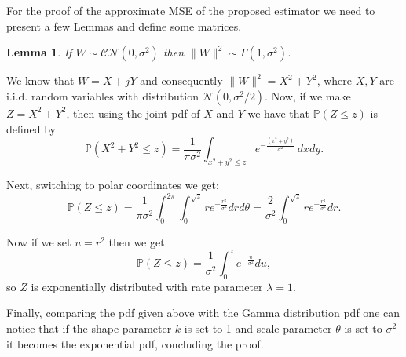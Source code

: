 \documentclass[10pt,journal,comsoc,final]{IEEEtran}
\newtheorem{lemma}{Lemma}
\begin{document}
\appendices
\section{}

For the proof of the approximate MSE of the proposed estimator we need to present a few Lemmas and define some matrices.

\begin{lemma} If $W \sim \mathcal{CN}(0,\sigma^2)$ then $\lVert W \rVert^{2} \sim \Gamma(1,\sigma^2)$.
\end{lemma}

\begin{IEEEproof} We know that $W = X + jY$ and consequently $\lVert W \rVert^{2} = X^2 + Y^2$, where $X, Y$ are i.i.d. random variables with distribution $\mathcal{N}(0,\sigma^{2}/2)$. Now, if we make $Z = X^2 + Y^2$, then using the joint pdf of $X$ and $Y$ we have that $\mathbb{P}(Z\leq z)$ is defined by
\begin{equation}\label{eq:exponential_into_gamma1}
\mathbb{P}(X^2+Y^2\leq z)= \frac{1}{\pi \sigma^2}\int_{x^2+y^2\leq z}e^{-\frac{(x^2+y^2)}{\sigma^2}} \ dxdy.
\end{equation}

Next, switching to polar coordinates we get:
\begin{equation}\label{eq:exponential_into_gamma2}
\mathbb{P}(Z\leq z) = \frac{1}{\pi \sigma^2}\int_{0}^{2\pi}\int_0^{\sqrt{z}}re^{-\frac{r^2}{\sigma^2}}drd\theta =\frac{2}{\sigma^2}\int_0^{\sqrt{z}}re^{-\frac{r^2}{\sigma^2}}dr.
\end{equation}

Now if we set $u=r^2$ then we get
\begin{equation}\label{eq:exponential_into_gamma3}
\mathbb{P}(Z\leq z)=\frac{1}{\sigma^2}\int_0^ze^{-\frac{u}{\sigma^2}}du,
\end{equation}
so $Z$ is exponentially distributed with rate parameter $\lambda = 1$.

Finally, comparing the pdf given above with the Gamma distribution pdf one can notice that  if the shape parameter $k$ is set to 1 and scale parameter $\theta$ is set to $\sigma^2$ it becomes the exponential pdf, concluding the proof.
\end{IEEEproof}
\end{document}
